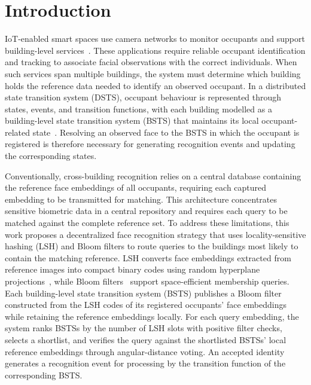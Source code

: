 \documentclass[pdflatex,sn-mathphys-num]{sn-jnl}%
\theoremstyle{thmstyleone}%
\theoremstyle{thmstyletwo}%
\theoremstyle{thmstylethree}%
\begin{document}


\maketitle

\section{Introduction}

IoT-enabled smart spaces use camera networks to monitor occupants and support building-level services~\cite{SM2022}. These applications require reliable occupant identification and tracking to associate facial observations with the correct individuals. When such services span multiple buildings, the system must determine which building holds the reference data needed to identify an observed occupant. In a distributed state transition system (DSTS), occupant behaviour is represented through states, events, and transition functions, with each building modelled as a building-level state transition system (BSTS) that maintains its local occupant-related state~\cite{mohan2020}. Resolving an observed face to the BSTS in which the occupant is registered is therefore necessary for generating recognition events and updating the corresponding states.

Conventionally, cross-building recognition relies on a central database containing the reference face embeddings of all occupants, requiring each captured embedding to be transmitted for matching. This architecture concentrates sensitive biometric data in a central repository and requires each query to be matched against the complete reference set. To address these limitations, this work proposes a decentralized face recognition strategy that uses locality-sensitive hashing (LSH) and Bloom filters to route queries to the buildings most likely to contain the matching reference. LSH converts face embeddings extracted from reference images into compact binary codes using random hyperplane projections~\cite{charikar2002}, while Bloom filters~\cite{bloom1970} support space-efficient membership queries. Each building-level state transition system (BSTS) publishes a Bloom filter constructed from the LSH codes of its registered occupants' face embeddings while retaining the reference embeddings locally. For each query embedding, the system ranks BSTSs by the number of LSH slots with positive filter checks, selects a shortlist, and verifies the query against the shortlisted BSTSs' local reference embeddings through angular-distance voting. An accepted identity generates a recognition event for processing by the transition function of the corresponding BSTS.
\end{document}
